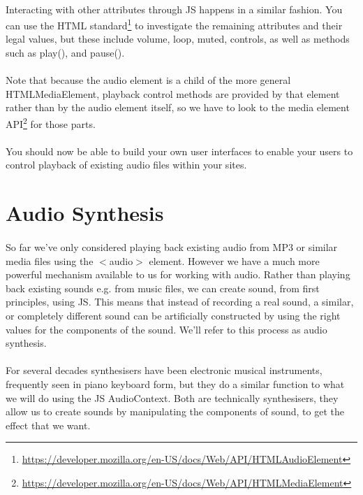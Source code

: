 \paragraph{} Interacting with other attributes through JS happens in a similar fashion. You can use the HTML standard\footnote{\url{https://developer.mozilla.org/en-US/docs/Web/API/HTMLAudioElement}} to investigate the remaining attributes and their legal values, but these include volume, loop, muted, controls, as well as methods such as play(), and pause().
\paragraph{} Note that because the audio element is a child of the more general HTMLMediaElement, playback control methods are provided by that element rather than by the audio element itself, so we have to look to the media element API\footnote{\url{https://developer.mozilla.org/en-US/docs/Web/API/HTMLMediaElement}} for those parts.
\paragraph{} You should now be able to build your own user interfaces to enable your users to control playback of existing audio files within your sites.


\section{Audio Synthesis}
\paragraph{} So far we've only considered playing back existing audio from MP3 or similar media files using the $<$audio$>$ element. However we have a much more powerful mechanism available to us for working with audio. Rather than playing back existing sounds e.g. from music files, we can create sound, from first principles, using JS. This means that instead of recording a real sound, a similar, or completely different sound can be artificially constructed by using the right values for the components of the sound. We'll refer to this process as audio synthesis.
\paragraph{} For several decades synthesisers have been electronic musical instruments, frequently seen in piano keyboard form, but they do a similar function to what we will do using the JS AudioContext. Both are technically synthesisers, they allow us to create sounds by manipulating the components of sound, to get the effect that we want.
